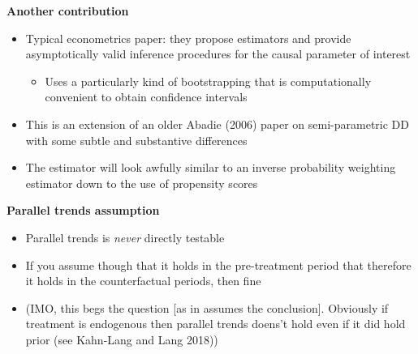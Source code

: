 \documentclass[notes=show]{beamer}
\begin{document}
\begin{frame}[plain]
\begin{center}
\textbf{Another contribution}
\end{center}

\begin{itemize}
\item Typical econometrics paper: they propose estimators and provide asymptotically valid inference procedures for the causal parameter of interest
	\begin{itemize}
	\item Uses a particularly kind of bootstrapping that is computationally convenient to obtain confidence intervals
	\end{itemize}
\item This is an extension of an older Abadie (2006) paper on semi-parametric DD with some subtle and substantive differences
\item The estimator will look awfully similar to an inverse probability weighting estimator down to the use of propensity scores

\end{itemize}

\end{frame}



\begin{frame}[plain]
\begin{center}
\textbf{Parallel trends assumption}
\end{center}

\begin{itemize}
\item Parallel trends is \emph{never} directly testable 
\item If you assume though that it holds in the pre-treatment period that therefore it holds in the counterfactual periods, then fine
\item (IMO, this begs the question [as in assumes the conclusion].  Obviously if treatment is endogenous then parallel trends doens't hold even if it did hold prior (see Kahn-Lang and Lang 2018))
\end{itemize}

\end{frame}
\end{document}
